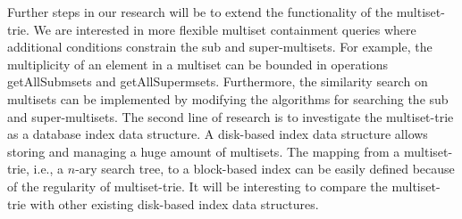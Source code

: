 %
Further steps in our research will be to extend the functionality of the multiset-trie. We are interested in more flexible multiset containment queries where additional conditions constrain the sub and super-multisets. For example, the multiplicity of an element in a multiset can be bounded in operations getAllSubmsets and getAllSupermsets. Furthermore, the similarity search on multisets can be implemented by modifying the algorithms for searching the sub and super-multisets. 
%
The second line of research is to investigate the multiset-trie as a database index data structure. A disk-based index data structure allows storing and managing a huge amount of multisets. The mapping from a multiset-trie, i.e., a $n$-ary search tree, to a block-based index can be easily defined because of the regularity of multiset-trie. It will be interesting to compare the multiset-trie with other existing disk-based index data structures.

